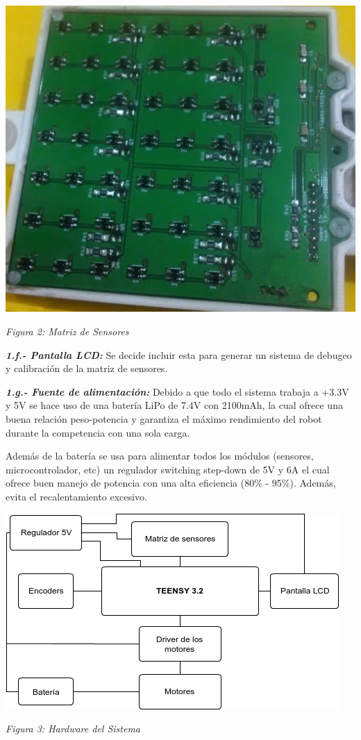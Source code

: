\documentclass[10pt,twocolumn,legalpaper,draft]{article}
\begin{document}
\begin{center}
		\includegraphics[scale=0.09]{matriz1}
		
		\textit{Figura 2: Matriz de Sensores}
\end{center}

\textit{\textbf{1.f.- Pantalla LCD:}}
Se decide incluir esta para generar un sistema de debugeo y calibración de la matriz de sensores.\newline

\textit{\textbf{1.g.- Fuente de alimentación:}}
Debido a que todo el sistema trabaja a +3.3V y 5V se hace uso de una batería LiPo de 7.4V con 2100mAh, la cual ofrece una buena relación peso-potencia y garantiza el máximo rendimiento del robot durante la competencia con una sola carga.\newline \indent

Además de la batería se usa para alimentar todos los módulos (sensores, microcontrolador, etc) un regulador switching step-down de 5V y 6A el cual ofrece buen manejo de potencia con una alta eficiencia (80\% - 95\%). Además, evita el recalentamiento excesivo.\newline
\vspace{0.8em}

\begin{center}
	\includegraphics[scale=0.49]{Hardware}
	
	\textit{Figura 3: Hardware del Sistema}
\end{center}
\end{document}
